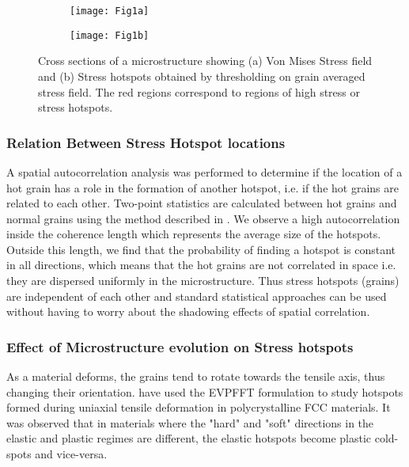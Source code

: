 \documentclass[preprint,1p,times,authoryear]{elsarticle}%
\begin{document}
\begin{figure}[!hbt]
\centering
    \begin{subfigure}[t]{0.4\textwidth}
        \centering
        \texttt{[image: Fig1a]}%
        \caption{ }
        \label{fig:stressmap}%
    \end{subfigure}
     \begin{subfigure}[t]{0.4\textwidth}
        \centering
        \texttt{[image: Fig1b]}%
        \caption{ }
        \label{fig:hotgrainmap}
    \end{subfigure}
    \caption{Cross sections of a microstructure showing (a) Von Mises Stress field and (b) Stress hotspots obtained by thresholding on grain averaged stress field. The red regions correspond to regions of high stress or stress hotspots. } 
    \label{fig:hotgrainpoint}
\end{figure}

\subsubsection{Relation Between Stress Hotspot locations}\label{Relation Between Stress Hotspot locations}
A spatial autocorrelation analysis was performed to  determine if the location of a hot grain has a role in the formation of another hotspot, i.e. if the hot grains are related to each other.  Two-point statistics are calculated between hot grains and normal grains using the method described in \cite{Fast2011}. We observe a high autocorrelation inside the coherence length which represents the average size of the hotspots. Outside this length, we find that the probability of finding a hotspot is constant in all directions, which means that the hot grains are not correlated in space i.e. they are dispersed uniformly in the microstructure. Thus stress hotspots (grains) are independent of each other and standard statistical approaches can be used without having to worry about the shadowing effects of spatial correlation.

\subsubsection{Effect of Microstructure evolution on Stress hotspots}\label{Effect of Microstructure evolution}
As a material deforms, the grains tend to rotate towards the tensile axis, thus changing their orientation. \cite{Lebensohn2012} have used the EVPFFT formulation to study hotspots formed during uniaxial tensile deformation in polycrystalline FCC materials. It was observed that in materials where the "hard" and "soft" directions in the elastic and plastic regimes are different, the elastic hotspots become plastic cold-spots and vice-versa. 
\end{document}
